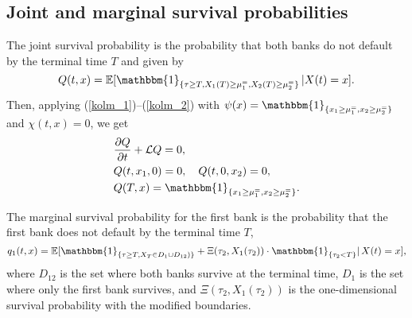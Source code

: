 \subsection{Joint and marginal survival probabilities}
\label{section:joint}
The joint survival probability is the probability that both banks do not default by the terminal time $T$ and given by
\begin{equation}
	Q(t, x) = \mathbb{E}[\mathbbm{1}_{\{\tau \ge T, X_1(T) \ge \mu_1^{=}, X_2(T) \ge \mu_2^{=}\}} \, | X(t) = x].
\end{equation}
Then, applying (\ref{kolm_1})--(\ref{kolm_2}) with $\psi(x) =\mathbbm{1}_{\{x_1 \ge \mu_1^{=}, x_2 \ge \mu_2^{=}\}}$ and $\chi(t, x) = 0$, we get
\begin{equation}
\label{joint_surv_prob}
\begin{aligned}
		& \frac{\partial Q}{\partial t} + \mathcal{L} Q = 0, \\
		& Q(t, x_{1}, 0) = 0, \quad Q(t, 0, x_2) = 0, \\
		& Q(T, x) = \mathbbm{1}_{\{x_1 \ge \mu_1^{=}, x_2 \ge \mu_2^{=}\}}.
\end{aligned}
\end{equation}

The marginal survival probability for the first bank is the probability that the first bank does not default by the terminal time $T$,
\begin{equation}
	q_1(t, x) = \mathbb{E}[\mathbbm{1}_{\{\tau \ge T, X_T \in D_1 \cup D_{12})\}} +  \Xi(\tau_2, X_1(\tau_2)) \cdot \mathbbm{1}_{\{\tau_2 < T \}}| \, X(t) = x],
\end{equation}
where $D_{12}$ is the set where both banks survive at the terminal time, $D_1$ is the set where only the first bank survives, and $ \Xi(\tau_2, X_1(\tau_2)) $ is the one-dimensional survival probability with the modified boundaries.

